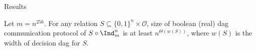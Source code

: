 \begin{frame}{Results}
    \begin{theorem}
        Let $m = n^{256}$. For any relation $S \subseteq \{0,1\}^n \times \mathcal{O}$, size of boolean
        (real) dag communication protocol of $S \circ \Ind_m^n$ is at least $n^{\Theta(w(S))}$, where
        $w(S)$ is the width of decision dag for $S$.
    \end{theorem}
\end{frame}
